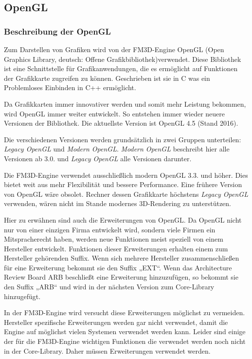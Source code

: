 \subsection{OpenGL}
\label{opengl}
\subsubsection{Beschreibung der OpenGL}
Zum Darstellen von Grafiken wird von der FM3D-Engine OpenGL (Open Graphics Library, deutsch: Offene Grafikbibliothek)verwendet. Diese Bibliothek ist eine Schnittstelle für Grafikanwendungen, die es ermöglicht auf Funktionen der Grafikkarte zugreifen zu können. Geschrieben ist sie in C was ein Problemloses Einbinden in C++ ermöglicht.

Da Grafikkarten immer innovativer werden und somit mehr Leistung bekommen, wird OpenGL immer weiter entwickelt. So entstehen immer wieder neuere Versionen der Bibliothek. Die aktuellste Version ist OpenGL 4.5 (Stand 2016). 

Die verschiedenen Versionen werden grundsätzlich in zwei Gruppen unterteilen: \textit{Legacy OpenGL} und \textit{Modern OpenGL}. \textit{Modern OpenGL} beschreibt hier alle Versionen ab 3.0. und \textit{Legacy OpenGL} alle Versionen darunter. 

Die FM3D-Engine verwendet ausschließlich modern OpenGL 3.3. und höher. Dies bietet weit aus mehr Flexibilität und bessere Performance. Eine frühere Version von OpenGL wäre obsolet.
Rechner dessen Grafikkarte höchstens \textit{Legacy OpenGL} verwenden, wären nicht im Stande modernes 3D-Rendering zu unterstützen.

Hier zu erwähnen sind auch die Erweiterungen von OpenGL. Da OpenGL nicht nur von einer einzigen Firma entwickelt wird, sondern viele Firmen ein Mitspracherecht haben, werden neue Funktionen meist speziell von einem Hersteller entwickelt. Funktionen dieser Erweiterungen erhalten einem zum Hersteller gehörenden Suffix. Wenn sich mehrere Hersteller zusammenschließen für eine Erweiterung bekommt sie den Suffix „EXT“. Wenn das Architecture Review Board ARB beschließt eine Erweiterung hinzuzufügen, so bekommt sie den Suffix „ARB“ und wird in der nächsten Version zum Core-Library hinzugefügt. 

In der FM3D-Engine wird versucht diese Erweiterungen möglichst zu vermeiden. Hersteller spezifische Erweiterungen werden gar nicht verwendet, damit die Engine auf möglichst vielen Systemen verwendet werden kann. Leider sind einige der für die FM3D-Engine wichtigen Funktionen die verwendet werden noch nicht in der Core-Library. Daher müssen Erweiterungen verwendet werden.

